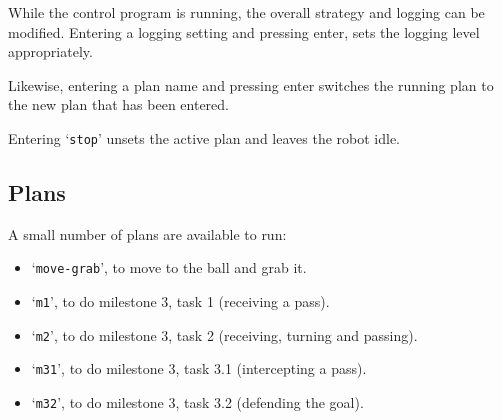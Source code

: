 \documentclass[12pt,a4paper]{article}
\begin{document}
While the control program is running, the overall strategy and logging can be modified. 
Entering a logging setting and pressing enter, sets the logging level appropriately.

Likewise, entering a plan name and pressing enter switches the running plan to the new plan that has been entered. 

Entering `\texttt{stop}' unsets the active plan and leaves the robot idle.

\subsection{Plans}

A small number of plans are available to run:

\begin{itemize}
    \item `\texttt{move-grab}', to move to the ball and grab it.
    \item `\texttt{m1}', to do milestone 3, task 1 (receiving a pass).
    \item `\texttt{m2}', to do milestone 3, task 2 (receiving, turning and passing).
    \item `\texttt{m31}', to do milestone 3, task 3.1 (intercepting a pass).
    \item `\texttt{m32}', to do milestone 3, task 3.2 (defending the goal).
\end{itemize}








\end{document}
